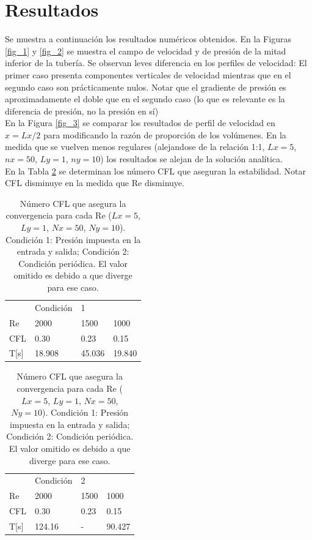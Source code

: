 \section{Resultados}

Se muestra a continuación los resultados numéricos obtenidos. En la Figuras \ref{fig_1} y \ref{fig_2} se muestra el campo de velocidad y de presión de la mitad inferior de la tubería. Se observan leves diferencia en los perfiles de velocidad: El primer caso presenta componentes verticales de velocidad mientras que en el segundo caso son prácticamente nulos. Notar que el gradiente de presión es aproximadamente el doble que en el segundo caso (lo que es relevante es la diferencia de presión, no la presión en sí)\\

En la Figura \ref{fig_3} se comparar los resultados de perfil de velocidad en $x=Lx/2$ para modificando la razón de proporción de los volúmenes. En la medida que se vuelven menos regulares (alejandose de la relación 1:1, $Lx=5$, $nx=50$, $Ly=1$, $ny=10$) los resultados se alejan de la solución analítica. \\

En la Tabla \ref{resultados_1} se determinan los número CFL que aseguran la estabilidad. Notar CFL disminuye en la medida que Re disminuye.

\begin{table}[H]
\centering
\begin{tabular}{|l|lll|} \hline
&Condición & 1 &  \\
Re & 2000	& 1500	& 1000 \\
CFL & 0.30	& 0.23	& 0.15 \\
T[s] & 18.908	& 45.036 & 19.840 \\ \hline
\end{tabular}
\begin{tabular}{|l|lll|} \hline
& Condición & 2 &  \\
Re & 2000	& 1500	& 1000 \\
CFL & 0.30	& 0.23	& 0.15 \\
T[s] & 124.16 & - & 90.427 \\ \hline
\end{tabular}
\caption{Número CFL que asegura la convergencia para cada Re ($Lx=5$, $Ly=1$, $Nx=50$, $Ny=10$). Condición 1: Presión impuesta en la entrada y salida; Condición 2: Condición periódica. El valor omitido es debido a que diverge para ese caso.} \label{resultados_1}
\end{table}


